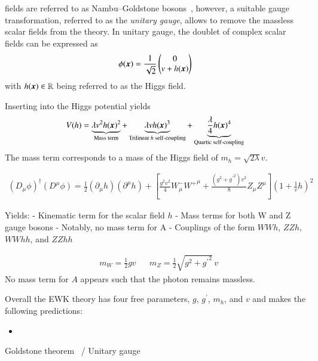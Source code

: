 fields are referred to as Nambu--Goldstone
bosons~\cite{Nambu:1960tm,Goldstone:1961eq}, however, a suitable gauge
transformation, referred to as the \emph{unitary gauge}, allows to remove the
massless scalar fields from the theory. In unitary gauge, the doublet of complex
scalar fields can be expressed as
\begin{align}
  \phi(\myvec{x}) = \frac{1}{\sqrt{2}}
  \begin{pmatrix}
    0 \\
    v + h(\myvec{x})
  \end{pmatrix}
  \label{eq:vacuum_state_perturb}
\end{align}
with $h(\myvec{x}) \in \mathbb{R}$ being referred to as the Higgs field.

Inserting  into the Higgs potential yields
\begin{align*}
  V(h) =
  \underbrace{\lambda v^2 h(\myvec{x})^2}_{\text{Mass term}}
  + \underbrace{\lambda v h(\myvec{x})^3}_{\text{Trilinear $h$ self-coupling}}
  + \underbrace{\frac{\lambda}{4} h(\myvec{x})^4}_{\text{Quartic self-coupling}}
\end{align*}
The mass term corresponds to a mass of the Higgs field of
$m_h = \sqrt{2 \lambda} v$.


\begin{align*}
  (D_\mu \phi)^\dagger (D^\mu \phi) =
  \frac{1}{2} (\partial_\mu h) (\partial^\mu h)
  + \left[
  \frac{g^2 v^2}{4} W^{-}_\mu {W^{+}}^\mu
  +
  \frac{(g^2 + {g^\prime}^2) v^2}{8} Z_\mu Z^\mu
  \right] \left( 1 + \frac{1}{v} h \right)^2
\end{align*}

Yields:
- Kinematic term for the scalar field $h$
- Mass terms for both W and Z gauge bosons
- Notably, no mass term for A
- Couplings of the form $WWh$, $ZZh$, $WWhh$, and $ZZhh$


\begin{align*}
  &m_W = \frac{1}{2} g v  &&m_Z = \frac{1}{2} \sqrt{g^2 + {g^\prime}^2} \, v
\end{align*}
No mass term for $A$ appears such that the photon remains massless.

Overall the EWK theory has four free parameters, $g$, $g^\prime$, $m_h$, and
$v$ and makes the following predictions:
\begin{itemize}
\item
\end{itemize}




Goldstone theorem~\cite{Goldstone:1961eq} / Unitary gauge


